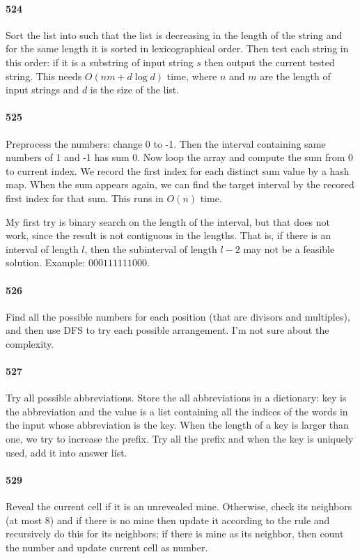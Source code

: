\documentclass[11pt]{article}
\begin{document}
\begin{itemize}
\paragraph{524}
Sort the list into such that the list is decreasing in the length of the string and for the same length it is sorted in lexicographical order.
Then test each string in this order: if it is a substring of input string $s$ then output the current tested string.
This needs $O(nm + d \log d)$ time, where $n$ and $m$ are the length of input strings and $d$ is the size of the list.

\paragraph{525}
Preprocess the numbers: change 0 to -1.
Then the interval containing same numbers of 1 and -1 has sum 0.
Now loop the array and compute the sum from 0 to current index. 
We record the first index for each distinct sum value by a hash map.
When the sum appears again, we can find the target interval by the recored first index for that sum.
This runs in $O(n)$ time.

My first try is binary search on the length of the interval, but that does not work, since the result is not contiguous in the lengths. That is, if there is an interval of length $l$, then the subinterval of length $l-2$ may not be a feasible solution. Example: $000111111000$.


\paragraph{526}
Find all the possible numbers for each position (that are divisors and multiples), and then use DFS to try each possible arrangement.
I'm not sure about the complexity. 

\paragraph{527}
Try all possible abbreviations. Store the all abbreviations in a dictionary: key is the abbreviation and the value is a list
containing all the indices of the words in the input whose abbreviation is the key. When the length of a key is larger than 
one, we try to increase the prefix. Try all the prefix and when the key is uniquely used, add it into answer list.


\paragraph{529}
Reveal the current cell if it is an unrevealed mine.
Otherwise, check its neighbors (at most 8) and if there is no mine then update it according to the rule and recursively do this for its neighbors; if there is mine as its neighbor, then count the number and update current cell as number.


\end{itemize}
\end{document}
